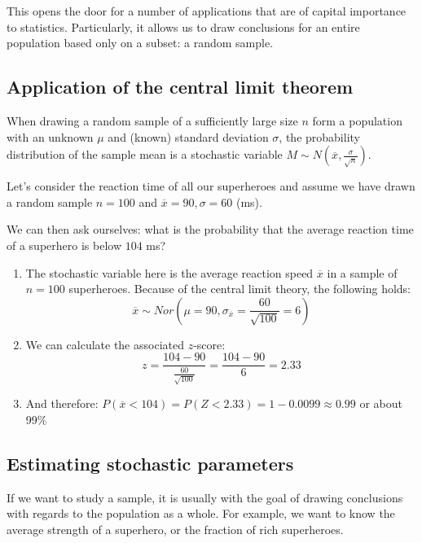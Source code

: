 This opens the door for a number of applications that are of capital importance to statistics. Particularly, it allows us to draw conclusions for an entire population based only on a subset: a random sample.

\subsection{Application of the central limit theorem}

When drawing a random sample of a sufficiently large size $n$ form a population with an unknown $\mu$ and (known) standard deviation $\sigma$, the probability distribution of the sample mean is a stochastic variable $M \sim N (\overline{x}, \frac{\sigma}{\sqrt{n}})$.

\begin{example}
  Let's consider the reaction time of all our superheroes and assume we have drawn a random sample $n = 100$ and $\overline{x} = 90, \sigma = 60$ (ms).
  
  We can then ask ourselves: what is the probability that the average reaction time of a superhero is below $104$ ms?

  \begin{enumerate}
    \item The stochastic variable here is the average reaction speed $\overline{x}$ in a sample of $n=100$ superheroes. Because of the central limit theory, the following holds:
    \[ \overline{x} \sim Nor(\mu = 90, \sigma_{\overline{x}} = \frac{60}{\sqrt{100}} = 6) \]
    \item We can calculate the associated $z$-score:
    \[ z = \frac{104-90}{\frac{60}{\sqrt{100}}} = \frac{104-90}{6} = 2.33 \]
    \item And therefore: $P(\overline{x} < 104) = P(Z < 2.33) = 1 - 0.0099 \approx 0.99$ or about 99\%
  \end{enumerate}
\end{example}

\subsection{Estimating stochastic parameters}
\label{ssec:estimating-stochastic-parameters}

If we want to study a sample, it is usually with the goal of drawing conclusions with regards to the population as a whole. For example, we want to know the average strength of a superhero, or the fraction of rich superheroes. 

